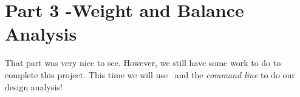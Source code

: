 \section{Part 3 -Weight and Balance Analysis}

That part was very nice to see. However, we still have some work to do to
complete this project. This time we will use \PY\ and the {\it command line} to
do our design analysis!


